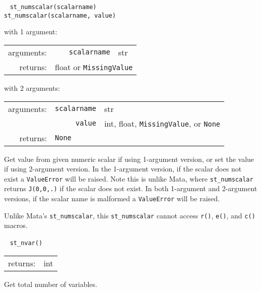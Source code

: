 \documentclass{article}
\begin{document}
			
			\ \newline
			\noindent \lstinline$st_numscalar(scalarname)$ \\
			\noindent \lstinline$st_numscalar(scalarname, value)$
								
			\vspace{1.5mm}
			\noindent 
			\indent with 1 argument:
			
			\indent \qquad \begin{tabular}{rrl}
					arguments: & \texttt{scalarname} & str \\
					returns: & \multicolumn{2}{l}{float or \lstinline$MissingValue$}
				\end{tabular}
								
			\vspace{1.5mm}
			\noindent 
			\indent with 2 arguments:
			
			\indent \qquad \begin{tabular}{rrl}
					arguments: & \texttt{scalarname} & str \\
					  & \texttt{value} & int, float, \lstinline$MissingValue$, or \texttt{None} \\
					returns: & \multicolumn{2}{l}{\texttt{None}}
				\end{tabular}
								
			\vspace{1.5mm}
			\noindent Get value from given numeric scalar if using 1-argument version, or set the value if using 2-argument version. In the 1-argument version, if the scalar does not exist a \lstinline{ValueError} will be raised. Note this is unlike Mata, where \lstinline{st_numscalar} returns \lstinline{J(0,0,.)} if the scalar does not exist. In both 1-argument and 2-argument versions, if the scalar name is malformed a \lstinline{ValueError} will be raised. 
			
			Unlike Mata's \lstinline{st_numscalar}, this \lstinline{st_numscalar} cannot access \lstinline{r()}, \lstinline{e()}, and \lstinline{c()} macros. \newline
			
			
			\ \newline
			\noindent \lstinline$st_nvar()$
								
			\vspace{1.5mm}
			\noindent 
			\indent \begin{tabular}{rl}
					returns: & int
				\end{tabular}
								
			\vspace{1.5mm}
			\noindent Get total number of variables. \newline
			
\end{document}
